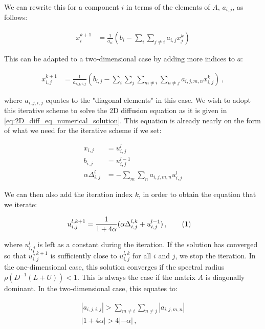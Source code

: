 \documentclass[reprint,english,notitlepage]{revtex4-1}  %
\newcommand\numberthis{\addtocounter{equation}{1}\tag{\theequation}}
\begin{document}
We can rewrite this for a component $i$ in terms of the elements of $A$, $a_{i,j}$, as follows:

\begin{align*}
x^{k+1}_i &= \frac{1}{a_{ii}} ( b_i - \sum\limits_i \sum\limits_{j\neq i} a_{i,j} x_j^k)
\end{align*}

This can be adapted to a two-dimensional case by adding more indices to $a$:

\begin{align*}
x_{i,j}^{k+1} &= \frac{1}{a_{i,j,i,j}} (b_{i,j} - \sum\limits_i \sum\limits_j \sum\limits_{m\neq i} \sum\limits_{n \neq j} a_{i,j,m,n} x_{i,j}^k ) \, ,
\end{align*}

where $a_{i,j,i,j}$ equates to the "diagonal elements" in this case. We wish to adopt this iterative scheme to solve the 2D diffusion equation as it is given in \eqref{eq:2D_diff_eq_numerical_solution}. This equation is already nearly on the form of what we need for the iterative scheme if we set:

\begin{align*}
x_{i,j} &= u_{i,j}^l \\
b_{i,j} &= u_{i,j}^{l-1} \\
\alpha \Delta_{i,j}^l &= -\sum\limits_m \sum\limits_n a_{i,j,m,n}  u_{i,j}^l
\end{align*} 

We can then also add the iteration index $k$, in order to obtain the equation that we iterate:

\begin{align*}
u_{i,j}^{l,k+1} &= \frac{1}{1 + 4\alpha} (\alpha \Delta_{i,j}^{l,k} + u_{i,j}^{l-1}) \, , \numberthis \label{eq:2D_diff_eq_jacobi_iter}
\end{align*}

where $u_{i,j}^l$ is left as a constant during the iteration. If the solution has converged so that $u_{i,j}^{l,k+1}$ is sufficiently close to $u_{i,j}^{l,k}$ for all $i$ and $j$, we stop the iteration. In the one-dimensional case, this solution converges if the spectral radius $\rho(D^{-1}(L+U)) < 1$. This is always the case if the matrix $A$ is diagonally dominant. In the two-dimensional case, this equates to:

\begin{align*}
|a_{i,j,i,j}| > \sum\limits_{m\neq i} \sum\limits_{n\neq j} |a_{i,j,m,n}| \\
|1 + 4 \alpha| > 4|-\alpha| \, ,
\end{align*}
\end{document}
